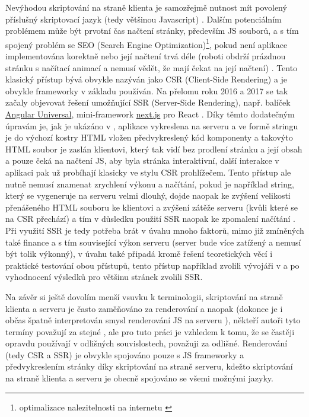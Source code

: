         Nevýhodou skriptování na straně klienta je samozřejmě nutnost mít povolený příslušný skriptovací jazyk (tedy většinou Javascript) \cite{scripting-sqa}. Dalším potenciálním problémem může být prvotní čas načtení stránky, především JS souborů, a s tím spojený problém se SEO (Search Engine Optimization)\footnote{optimalizace nalezitelnosti na internetu \cite{seo}}, pokud není aplikace implementována korektně nebo její načtení trvá déle (roboti obdrží prázdnou stránku s načítací animací a nemusí vědět, že mají čekat na její načtení) \cite{scripting-freecodecamp}\cite{scripting-hackernoon}. Tento klasický přístup bývá obvykle nazýván jako CSR (Client-Side Rendering) a je obvykle frameworky v základu používán. Na přelomu roku 2016 a 2017 se tak začaly objevovat řešení umožňující SSR (Server-Side Rendering), např. balíček \href{https://github.com/angular/universal}{Angular Universal}, mini-framework \href{https://github.com/zeit/next.js/}{next.js} pro React \cite{scripting-hackernoon}. Díky těmto dodatečným úpravám je, jak je ukázáno v \cite{scripting-ytb}, aplikace vykreslena na serveru a ve formě stringu je do výchozí kostry HTML vložen předvykreslený kód komponenty a takovýto HTML soubor je zaslán klientovi, který tak vidí bez prodlení stránku a její obsah a pouze čeká na načtení JS, aby byla stránka interaktivní, další interakce v aplikaci pak už probíhají klasicky ve stylu CSR prohlížečem. Tento přístup ale nutně nemusí znamenat zrychlení výkonu a načítání, pokud je například string, který se vygeneruje na serveru velmi dlouhý, dojde naopak ke zvýšení velikosti přenášeného HTML souboru ke klientovi a zvýšení zátěže serveru (kvůli které se na CSR přechází) a tím v důsledku použití SSR naopak ke zpomalení načítání \cite{scripting-hackernoon}. Při využití SSR je tedy potřeba brát v úvahu mnoho faktorů, mimo již zmíněných také finance a s tím související výkon serveru (server bude více zatížený a nemusí být tolik výkonný), v úvahu také připadá kromě řešení teoretických věcí i praktické testování obou přístupů, tento přístup například zvolili vývojáři v \cite{scripting-benchmark} a po vyhodnocení výsledků pro většinu stránek zvolili SSR.
        
        Na závěr si ještě dovolím menší vsuvku k terminologii, skriptování na straně klienta a serveru je často zaměňováno za renderování a naopak (dokonce je i občas špatně interpretován smysl renderování JS na serveru \cite{scripting-chyby}), někteří autoři tyto termíny považují za stejné \cite{scripting-freecodecamp}, ale pro tuto práci je vzhledem k tomu, že se častěji opravdu používají v odlišných souvislostech, považuji za odlišné. Renderování (tedy CSR a SSR) je obvykle spojováno pouze s JS frameworky a předvykreslením stránky díky skriptování na straně serveru, kdežto skriptování na straně klienta a serveru je obecně spojováno se všemi možnými jazyky.
    
